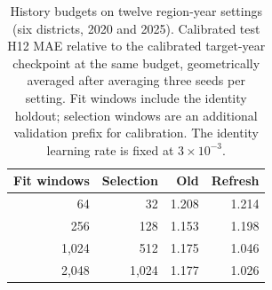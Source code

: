 \begin{table}[t]
\centering
\caption{History budgets on twelve region-year settings (six districts, 2020 and 2025). Calibrated test H12 MAE relative to the calibrated target-year checkpoint at the same budget, geometrically averaged after averaging three seeds per setting. Fit windows include the identity holdout; selection windows are an additional validation prefix for calibration. The identity learning rate is fixed at $3\times10^{-3}$.}
\label{tab:budget}
\begin{tabular}{rrrr}
\toprule
Fit windows & Selection & Old & Refresh \\
\midrule
64 & 32 & 1.208 & 1.214 \\
256 & 128 & 1.153 & 1.198 \\
1,024 & 512 & 1.175 & 1.046 \\
2,048 & 1,024 & 1.177 & 1.026 \\
\bottomrule
\end{tabular}
\end{table}
